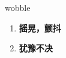 
\begin{frame}
{\huge wobble}
\begin{center}
\begin{enumerate}\Large
  \item \textbf{摇晃，颤抖}
  \item \textbf{犹豫不决}
\end{enumerate}
\end{center}
\end{frame}
